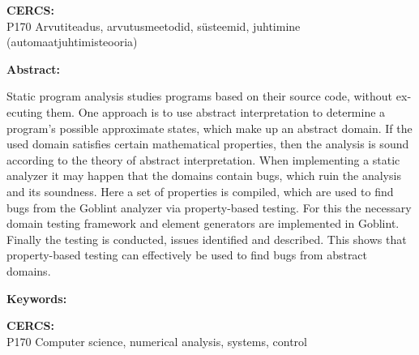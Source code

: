 \documentclass[../thesis.tex]{subfiles}
\begin{document}
\noindent\textbf{CERCS:}\\
P170 Arvutiteadus, arvutusmeetodid, süsteemid, juhtimine (automaatjuhtimisteooria)

\vspace*{5ex}

\begin{otherlanguage}{english}

\noindent\textbf{\large \mytitle}

\vspace*{1ex}

\noindent\textbf{Abstract:}

\noindent
Static program analysis studies programs based on their source code, without executing them.
One approach is to use abstract interpretation to determine a program's possible approximate states, which make up an abstract domain. If the used domain satisfies certain mathematical properties, then the analysis is sound according to the theory of abstract interpretation.
When implementing a static analyzer it may happen that the domains contain bugs, which ruin the analysis and its soundness.
Here a set of properties is compiled, which are used to find bugs from the Goblint analyzer via property-based testing.
For this the necessary domain testing framework and element generators are implemented in Goblint. Finally the testing is conducted, issues identified and described.
This shows that property-based testing can effectively be used to find bugs from abstract domains.

\vspace*{1ex}

\noindent\textbf{Keywords:}\\
\mykeywords

\vspace*{1ex}

\noindent\textbf{CERCS:}\\
P170 Computer science, numerical analysis, systems, control

\vspace*{1ex}

\end{otherlanguage} %
\end{document}
